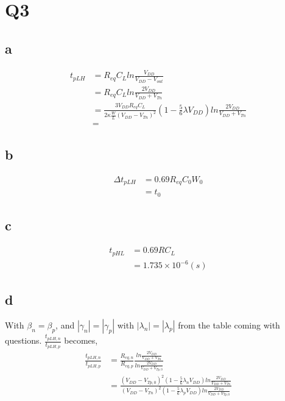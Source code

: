\documentclass[a4paper,10pt]{article}
\begin{document}
\section*{Q3}
\subsection*{a}
\begin{equation}
\begin{split}
t_{pLH} &= R_{eq}C_L ln\frac{V_{DD}}{V_{DD} - V_{out}}\\
&= R_{eq}C_L ln\frac{2V_{DD}}{V_{DD} + V_{Tn}}\\
&= \frac{3V_{DD}R_{eq}C_{L}}{2\kappa\frac{W}{L}(V_{DD} - V_{Tn})^2} (1-\frac{5}{6} \lambda V_{DD})
ln\frac{2V_{DD}}{V_{DD}+V_{Tn}}\\
&=
\end{split}
\end{equation}
\subsection*{b}
\begin{equation}
\begin{split}
\Delta t_{pLH} &= 0.69R_{eq}C_0 W_0\\
&= t_0
\end{split}
\end{equation}
\subsection*{c}
\begin{equation}
\begin{split}
t_{pHL} &= 0.69RC_L\\
& = 1.735 \times 10^{-6} (s)
\end{split}
\end{equation}
\subsection*{d}
With \begin{math}\beta_n = \beta_p\end{math}, and \begin{math}|\gamma_n| = |\gamma_p|\end{math} with 
\begin{math}|\lambda_n| = |\lambda_p|\end{math} from the table coming with questions.
\begin{math}\frac{t_{pLH, n}}{t_{pLH, p}}\end{math} becomes,
\begin{equation}
 \begin{split}
  \frac{t_{pLH, n}}{t_{pLH, p}} &= \frac{R_{eq, n}}{R_{eq, p}}\frac{ln\frac{2V_{DD}}{V_{DD} + V_{Tn}}}{ln\frac{2V_{DD}}{V_{DD} + 
  V_{Tp, 0}}} \\
  &= \frac{(V_{DD}-V_{Tp, 0})^2 (1-\frac{5}{6}\lambda_n V_{DD})ln\frac{2V_{DD}}{V_{DD} + V_{Tn}}}
  {(V_{DD}-V_{Tn})^2 (1-\frac{5}{6}\lambda_p V_{DD})ln\frac{2V_{DD}}{V_{DD} +V_{Tp, 0}}}
 \end{split}
\end{equation}
\end{document}
